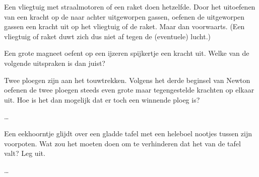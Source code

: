 \documentclass{ximera}
\begin{document}
\begin{example}\nl
	Een vliegtuig met straalmotoren of een raket doen hetzelfde. Door het uitoefenen van een kracht op de naar achter uitgeworpen gassen, oefenen de uitgeworpen gassen een kracht uit op het vliegtuig of de raket. Maar dan voorwaarts. (Een vliegtuig of raket duwt zich dus niet af tegen de (eventuele) lucht.)
\end{example}

\begin{exercise}
	Een grote magneet oefent op een ijzeren spijkertje een kracht uit. Welke van de volgende uitspraken is dan juist?
	\begin{multipleChoice}
	\end{multipleChoice}
\end{exercise}

\begin{exercise}
	Twee ploegen zijn aan het touwtrekken. Volgens het derde beginsel van Newton oefenen de twee ploegen steeds even grote maar tegengestelde krachten op elkaar uit. Hoe is het dan mogelijk dat er toch een winnende ploeg is?
	\begin{oplossing}
		\dots
	\end{oplossing}
\end{exercise}

\begin{exercise}
	Een eekhoorntje glijdt over een gladde tafel met een heleboel nootjes tussen zijn voorpoten. Wat zou het moeten doen om te verhinderen dat het van de tafel valt? Leg uit.
	
	\begin{oplossing}
		\dots
	\end{oplossing}
\end{exercise}
\end{document}
